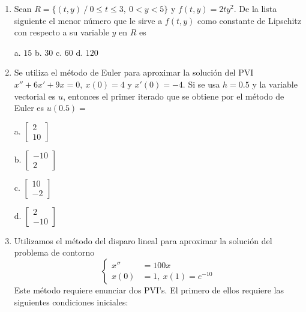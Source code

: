 \documentclass[11pt]{article}
\begin{document}
\begin{enumerate}
\item{} Sean $R=\{(t,y)\ /\ 0\leq t\leq 3,\ 0<y<5\}$ y $f(t,y)=2ty^2$. De la lista siguiente el menor número que le sirve a $f(t,y)$ como constante de Lipschitz con respecto a su variable $y$ en $R$ es

\vspace{4pt}
\noindent a. $15$ \hspace{1cm} b. $30$ \hspace{1cm} c. $60$ \hspace{1cm} d. $120$

\item{} Se utiliza el método de Euler para aproximar la solución del PVI $x''+6x'+9x=0,\ x(0)=4$ y $x'(0)=-4$. Si se usa $h=0.5$ y la variable vectorial es $u$, entonces el primer iterado que se obtiene por el método de Euler es $u(0.5)=$

\vspace{4pt}
\noindent
\begin{minipage}[t]{0.24\linewidth}
a. $\begin{bmatrix}2\\10\end{bmatrix}$
\end{minipage}%
\begin{minipage}[t]{0.24\linewidth}
b. $\begin{bmatrix}-10\\2\end{bmatrix}$
\end{minipage}%
\begin{minipage}[t]{0.24\linewidth}
c. $\begin{bmatrix}10\\-2\end{bmatrix}$
\end{minipage}%
\begin{minipage}[t]{0.24\linewidth}
d. $\begin{bmatrix}2\\-10\end{bmatrix}$
\end{minipage}

\item{} Utilizamos el método del disparo lineal para aproximar la solución del problema de contorno
\[
\left\{
\begin{aligned}
x'' &= 100x\\
x(0) &= 1,\ x(1)=e^{-10}
\end{aligned}
\right.
\]
\noindent Este método requiere enunciar dos PVI's. El primero de ellos requiere las siguientes condiciones iniciales:


\end{enumerate}
\end{document}
